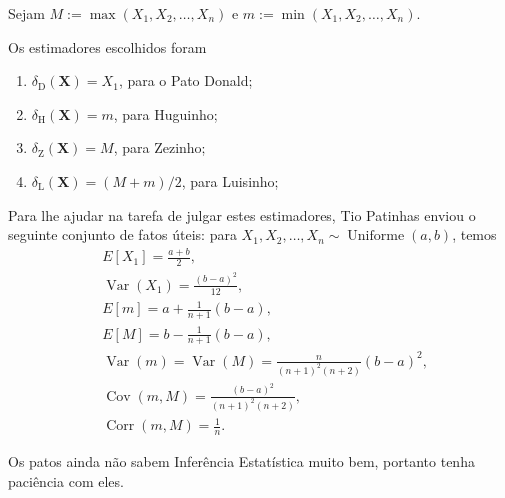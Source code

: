 \documentclass[a4paper,10pt, notitlepage]{report}
\newcommand{\vr}{\operatorname{Var}} %
\newcommand{\rs}{X_1, X_2, \ldots, X_n} %
\newcommand{\bX}{\boldsymbol{X}} %
\begin{document}
Sejam $M := \max\left(\rs \right)$ e $m := \min\left(\rs\right)$.

Os estimadores escolhidos foram
\begin{enumerate}
 \item $\delta_{\text{D}}(\bX) = X_1$, para o Pato Donald;
 \item $\delta_{\text{H}}(\bX) = m$, para Huguinho;
 \item $\delta_{\text{Z}}(\bX) = M$, para Zezinho;
 \item $\delta_{\text{L}}(\bX) = (M+m)/2$, para Luisinho;
\end{enumerate}

Para lhe ajudar na tarefa de julgar estes estimadores, Tio Patinhas enviou o seguinte conjunto de fatos úteis: para $\rs \sim \operatorname{Uniforme}(a, b)$, temos
\begin{align*}
&E[X_1] = \frac{a + b}{2},\\
& \vr(X_1) = \frac{(b-a)^2}{12},\\
&E[m] = a + \frac{1}{n+1}(b-a),\\
&E[M] = b - \frac{1}{n+1}(b-a),\\
&\vr(m) = \vr(M) = \frac{n}{(n+1)^2(n+2)}(b-a)^2,\\
&\operatorname{Cov}\left(m, M\right) = \frac{(b-a)^2}{(n+1)^2(n+2)},\\
&\operatorname{Corr}\left(m, M\right) = \frac{1}{n}.
\end{align*}

Os patos ainda não sabem Inferência Estatística muito bem, portanto tenha paciência com eles.
\end{document}
